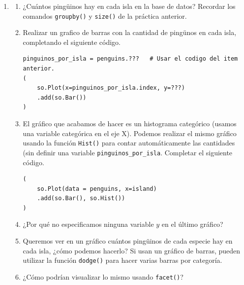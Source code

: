 \documentclass[a4paper,11pt]{article}
\theoremstyle{definition}
\begin{document}
\begin{enumerate}[resume]
?`Qu\'e resultado esperan para el siguiente gráfico? ?`Cu\'ales codificaciones se pasan de \lstinline{Plot()} a \lstinline{Dot()} y cuáles no pueden pasarse? ¿Cuáles codificaciones se establecen en \lstinline{Dot()}? ¿Cuáles variables están asignadas directamente en \lstinline{Dot()}? ¿De qué color van a pintarse los puntos?



\begin{lstlisting}
(
    so.Plot(
        penguins, x="bill_length_mm", y="bill_depth_mm",
        edgewidth="body_mass_g", marker = "species",
        linestyle = "island", color = "species"
    )
    .add(so.Dot(color=".8"), edgecolor="sex")
)
\end{lstlisting}

\item 
\begin{enumerate}
\item ¿Cuántos pingüinos hay en cada isla en la base de datos? Recordar los comandos \lstinline{groupby()} y \lstinline{size()} de la práctica anterior.
\item Realizar un grafico de barras con la cantidad de pingünos en cada isla, completando el siguiente código.
\begin{lstlisting}
pinguinos_por_isla = penguins.???   # Usar el codigo del item anterior.
(
    so.Plot(x=pinguinos_por_isla.index, y=???)
    .add(so.Bar())
)
\end{lstlisting}
\item El gráfico que acabamos de hacer es un histograma categórico (usamos una variable categórica en el eje X). Podemos realizar el mismo gráfico usando la función \lstinline{Hist()} para contar automáticamente las cantidades (sin definir una variable \lstinline{pinguinos_por_isla}. Completar el siguiente código.
\begin{lstlisting}
(
    so.Plot(data = penguins, x=island)
    .add(so.Bar(), so.Hist())
)
\end{lstlisting}
\item ¿Por qué no especificamos ninguna variable $y$ en el último gráfico?
\item Queremos ver en un gráfico cuántos pingüinos de cada especie hay en cada isla, ¿cómo podemos hacerlo? Si usan un gráfico de barras, pueden utilizar la función \lstinline{dodge()} para hacer varias barras por categoría.
\item ¿Cómo podrían visualizar lo mismo usando \lstinline{facet()}?
\end{enumerate}


\end{enumerate}
\end{document}
